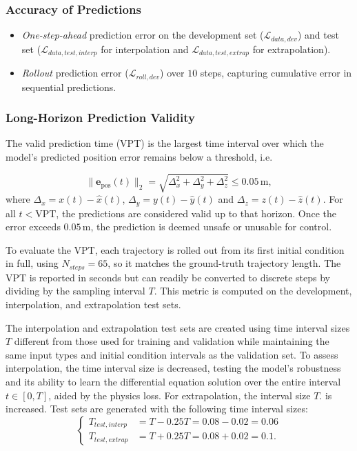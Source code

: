\subsubsection{Accuracy of Predictions}
\begin{itemize}
    \item \textit{One-step-ahead} prediction error on the development set ($\mathcal{L}_{data,dev}$) and test set ($\mathcal{L}_{data,test,interp}$ for interpolation and $\mathcal{L}_{data,test,extrap}$ for extrapolation).
    \item \textit{Rollout} prediction error ($\mathcal{L}_{roll,dev}$) over $10$ steps, capturing cumulative error in sequential predictions.
\end{itemize}
\subsubsection{Long-Horizon Prediction Validity}
The valid prediction time (VPT) is the largest time interval over which the model’s predicted position error remains below a threshold, i.e.

\begin{equation}
\|\mathbf{e}_{\text{pos}}(t)\|_2 = \sqrt{\Delta_x^2 + \Delta_y^2 + \Delta_z^2} \leq 0.05\,\mathrm{m}, 
\end{equation}
where $\Delta_x = x(t) - \hat{x}(t)$, $\Delta_y = y(t) - \hat{y}(t)$ and $\Delta_z = z(t) - \hat{z}(t)$. For all $t < \text{VPT}$, the predictions are considered valid up to that horizon. Once the error exceeds $0.05\,\mathrm{m}$, the prediction is deemed unsafe or unusable for control.

To evaluate the VPT, each trajectory is rolled out from its first initial condition in full, using 
$N_{steps} = 65$, so it matches the ground-truth trajectory length. The VPT is reported in seconds but can readily be converted to discrete steps by dividing by the sampling interval $T$. This metric is computed on the development, interpolation, and extrapolation test sets.

The interpolation and extrapolation test sets are created using time interval sizes $T$ different from those used for training and validation while maintaining the same input types and initial condition intervals as the validation set. To assess interpolation, the time interval size is decreased, testing the model's robustness and its ability to learn the differential equation solution over the entire interval $t\in[0,T]$, aided by the physics loss. For extrapolation, the interval size $T$. is increased. Test sets are generated with the following time interval sizes:
\begin{equation}
\begin{cases}
    T_{test,interp} &= T - 0.25T = 0.08 - 0.02 = 0.06 \\
    T_{test,extrap} &= T + 0.25T = 0.08 + 0.02 = 0.1.
\end{cases}
\end{equation}

